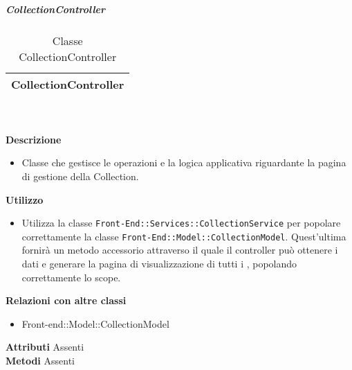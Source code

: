 			\subparagraph{CollectionController} 
\begin{table}[ht]
\begin{center}
\bgroup
	\setlength{\arrayrulewidth}{0.6mm}
	\def\arraystretch{1}
		\begin{tabular}{ | p{12cm} | }
				\hline  
					\centerline{\textbf{CollectionController}}
		\\ \hline 
				\hline
				\hline
		
		\end{tabular}
\egroup
\caption{Classe CollectionController}
\end{center}
\end{table} \textbf{\\ \\ Descrizione}
\begin{itemize}
\item[] Classe che gestisce le operazioni e la logica applicativa riguardante la pagina di gestione della Collection.
\end{itemize} 
\textbf{Utilizzo}
\begin{itemize}
\item[] Utilizza la classe \texttt{Front-End::Services::CollectionService} per popolare correttamente la classe \texttt{Front-End::Model::CollectionModel}. Quest'ultima fornirà un metodo accessorio attraverso il quale il controller può ottenere i dati e generare la pagina di visualizzazione di tutti i , popolando correttamente lo scope.
\end{itemize}
\textbf{Relazioni con altre classi}
\begin{itemize}
\item{Front-end::Model::CollectionModel}
\end{itemize}
\textbf{Attributi}
Assenti \\
\textbf{Metodi}
Assenti \\

